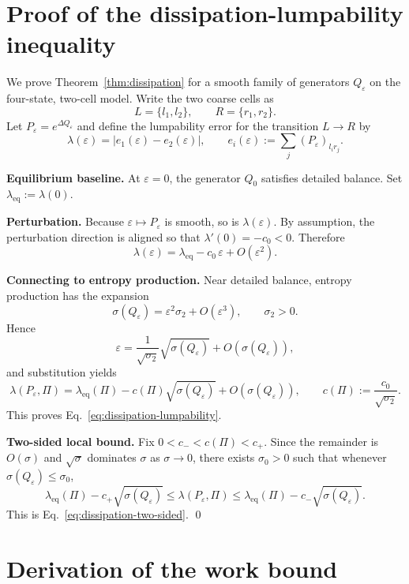 \documentclass[11pt,a4paper]{article}
\theoremstyle{definition}
\theoremstyle{remark}
\newcommand{\Eqref}[1]{Eq.~\eqref{#1}}
\begin{document}
\begin{appendices}
\section{Proof of the dissipation-lumpability inequality}\label{app:dissipation}

We prove Theorem~\ref{thm:dissipation} for a smooth family of generators $Q_\varepsilon$ on the four-state, two-cell model. Write the two coarse cells as
\[
L=\{l_1,l_2\}, \qquad R=\{r_1,r_2\}.
\]
Let $P_\varepsilon=e^{\Delta Q_\varepsilon}$ and define the lumpability error for the transition $L \to R$ by
\[
\lambda(\varepsilon) = |e_1(\varepsilon)-e_2(\varepsilon)|,
\qquad
e_i(\varepsilon) := \sum_j (P_\varepsilon)_{l_i r_j}.
\]

\textbf{Equilibrium baseline.}
At $\varepsilon=0$, the generator $Q_0$ satisfies detailed balance. Set $\lambda_{\mathrm{eq}}:=\lambda(0)$.

\textbf{Perturbation.}
Because $\varepsilon \mapsto P_\varepsilon$ is smooth, so is $\lambda(\varepsilon)$. By assumption, the perturbation direction is aligned so that $\lambda'(0)=-c_0<0$. Therefore
\[
\lambda(\varepsilon)
=
\lambda_{\mathrm{eq}} - c_0\,\varepsilon + O(\varepsilon^2).
\]

\textbf{Connecting to entropy production.}
Near detailed balance, entropy production has the expansion
\[
\sigma(Q_\varepsilon) = \varepsilon^2 \sigma_2 + O(\varepsilon^3),
\qquad \sigma_2>0.
\]
Hence
\[
\varepsilon = \frac{1}{\sqrt{\sigma_2}}\sqrt{\sigma(Q_\varepsilon)} + O(\sigma(Q_\varepsilon)),
\]
and substitution yields
\[
\lambda(P_\varepsilon,\Pi)
=
\lambda_{\mathrm{eq}}(\Pi) - c(\Pi)\sqrt{\sigma(Q_\varepsilon)} + O(\sigma(Q_\varepsilon)),
\qquad
c(\Pi):=\frac{c_0}{\sqrt{\sigma_2}}.
\]
This proves \Eqref{eq:dissipation-lumpability}.

\textbf{Two-sided local bound.}
Fix $0<c_-<c(\Pi)<c_+$. Since the remainder is $O(\sigma)$ and $\sqrt{\sigma}$ dominates $\sigma$ as $\sigma\to 0$, there exists $\sigma_0>0$ such that whenever $\sigma(Q_\varepsilon)\leq \sigma_0$,
\[
\lambda_{\mathrm{eq}}(\Pi) - c_+\sqrt{\sigma(Q_\varepsilon)}
\leq
\lambda(P_\varepsilon,\Pi)
\leq
\lambda_{\mathrm{eq}}(\Pi) - c_-\sqrt{\sigma(Q_\varepsilon)}.
\]
This is \Eqref{eq:dissipation-two-sided}. \qed

\section{Derivation of the work bound}\label{app:cost}


\end{appendices}
\end{document}
